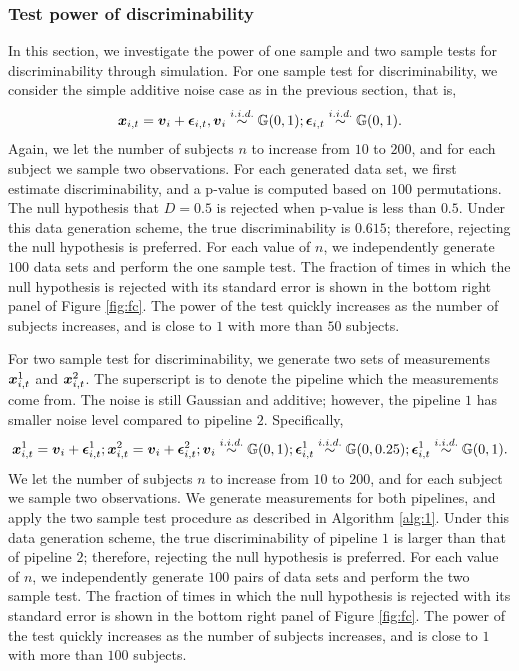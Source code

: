 \documentclass{article}
\begin{document}
\subsubsection{Test power of discriminability}
In this section, we investigate the power of one sample and two sample tests for discriminability through simulation. For one sample test for discriminability, we consider the simple additive noise case as in the previous section, that is,
\[\boldsymbol{x}_{i,t}= \boldsymbol{v}_{i} + \boldsymbol{\epsilon}_{i,t}, \boldsymbol{v}_i \overset{i.i.d.}{\sim} \mathbb{G}(0,1) ; \boldsymbol{\epsilon}_{i,t} \overset{i.i.d.}{\sim} \mathbb{G}(0,1). \]
Again, we let the number of subjects $n$ to increase from $10$ to $200$, and for each subject we sample two observations. For each generated data set, we first estimate discriminability, and a p-value is computed based on $100$ permutations. The null hypothesis that $D=0.5$ is rejected when p-value is less than $0.5$. Under this data generation scheme, the true discriminability is $0.615$; therefore, rejecting the null hypothesis is preferred. For each value of $n$, we independently generate $100$ data sets and perform the one sample test. The fraction of times in which the null hypothesis is rejected with its standard error is shown in the bottom right panel of Figure \ref{fig:fc}. The power of the test quickly increases as the number of subjects increases, and is close to $1$ with more than $50$ subjects.

For two sample test for discriminability, we generate two sets of measurements ${\boldsymbol{x}_{i,t}^1}$ and ${\boldsymbol{x}_{i,t}^2}$. The superscript is to denote the pipeline which the measurements come from. The noise is still Gaussian and additive; however, the pipeline $1$ has smaller noise level compared to pipeline $2$. Specifically,
\[\boldsymbol{x}_{i,t}^1= \boldsymbol{v}_{i} + \boldsymbol{\epsilon}_{i,t}^1; \boldsymbol{x}_{i,t}^2= \boldsymbol{v}_{i} + \boldsymbol{\epsilon}_{i,t}^2; \boldsymbol{v}_i \overset{i.i.d.}{\sim} \mathbb{G}(0,1); \boldsymbol{\epsilon}_{i,t}^1 \overset{i.i.d.}{\sim} \mathbb{G}(0,0.25);\boldsymbol{\epsilon}_{i,t}^1 \overset{i.i.d.}{\sim} \mathbb{G}(0,1). \]
We let the number of subjects $n$ to increase from $10$ to $200$, and for each subject we sample two observations. We generate measurements for both pipelines, and apply the two sample test procedure as described in Algorithm \ref{alg:1}. Under this data generation scheme, the true discriminability of pipeline $1$ is larger than that of pipeline $2$; therefore, rejecting the null hypothesis is preferred. For each value of $n$, we independently generate $100$ pairs of data sets and perform the two sample test. The fraction of times in which the null hypothesis is rejected with its standard error is shown in the bottom right panel of Figure \ref{fig:fc}. The power of the test quickly increases as the  number of subjects increases, and is close to $1$ with more than $100$ subjects.
\end{document}
